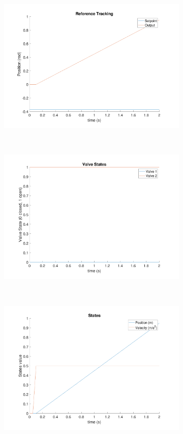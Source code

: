 \documentclass[11pt,a4paper]{article}
\begin{document}
\begin{figure}[!hbt]
    \centering
    \begin{subfigure}[t]{0.45\textwidth}
    \centering
    \includegraphics[width=\textwidth]{figure5.pdf}
    \caption{}
    \end{subfigure}
    ~
    \begin{subfigure}[t]{0.45\textwidth}
    \centering
    \includegraphics[width=\textwidth]{figure6.pdf}
    \caption{}
    \end{subfigure}\\
    \begin{subfigure}[t]{0.45\textwidth}
    \centering
    \includegraphics[width=\textwidth]{figure7.pdf}

\end{subfigure}
\end{figure}
\end{document}

